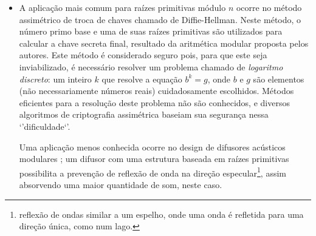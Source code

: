 \documentclass{article}
\begin{document}
\begin{itemize}
\item A aplicação mais comum para raízes primitivas módulo $n$ ocorre no
método assimétrico de troca de chaves chamado de Diffie-Hellman. Neste método, o
número primo base e uma de suas raízes primitivas são utilizados para calcular a
chave secreta final, resultado da aritmética modular proposta pelos autores.
Este método é considerado seguro pois, para que este seja inviabilizado, é
necessário resolver um problema chamado de \emph{logaritmo discreto}: um inteiro
$k$ que resolve a equação $b^k = g$, onde $b$ e $g$ são elementos (não
necessariamente números reais) cuidadosamente escolhidos. Métodos eficientes
para a resolução deste problema não são conhecidos, e diversos algoritmos de
criptografia assimétrica baseiam sua segurança nessa `'dificuldade`'.

Uma aplicação menos conhecida ocorre no design de difusores acústicos modulares
\cite{Walker:1990}; um difusor com uma estrutura baseada em raízes primitivas
possibilita a prevenção de reflexão de onda na direção
especular\footnote{reflexão de ondas similar a um espelho, onde uma onda é
refletida para uma direção única, como num lago.}, assim absorvendo uma maior
quantidade de som, neste caso.

\end{itemize}



\end{document}
